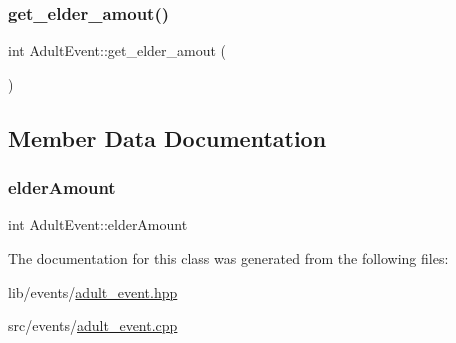 \mbox{\label{class_adult_event_aabbe1a98b685b4e00bb5a258b35e7f2f}} 
\subsubsection{\texorpdfstring{get\+\_\+elder\+\_\+amout()}{get\_elder\_amout()}}
{\footnotesize\ttfamily int Adult\+Event\+::get\+\_\+elder\+\_\+amout (\begin{DoxyParamCaption}{ }\end{DoxyParamCaption})\hspace{0.3cm}{\ttfamily [inline]}}



\subsection{Member Data Documentation}
\mbox{\label{class_adult_event_a4c3a51c94f97eff72e54530399955aa0}} 
\subsubsection{\texorpdfstring{elder\+Amount}{elderAmount}}
{\footnotesize\ttfamily int Adult\+Event\+::elder\+Amount\hspace{0.3cm}{\ttfamily [protected]}}



The documentation for this class was generated from the following files\+:\begin{DoxyCompactItemize}
\item 
lib/events/\hyperlink{adult__event_8hpp}{adult\+\_\+event.\+hpp}\item 
src/events/\hyperlink{adult__event_8cpp}{adult\+\_\+event.\+cpp}\end{DoxyCompactItemize}

